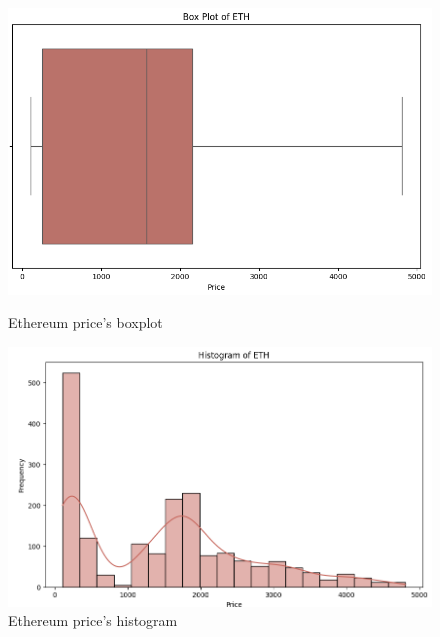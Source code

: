 \documentclass{ieeeojies}
\begin{document}
\begin{figure}[H]
	\centering
	\begin{minipage}{0.23\textwidth}
		\centering
		\includegraphics[width=1\textwidth]{bibliography/Figure/ETH_BoxPlot.PNG}
		\caption{Ethereum price's boxplot}
		\label{fig:1}
	\end{minipage}
	\hfill
	\begin{minipage}{0.23\textwidth}
		\centering
		\includegraphics[width=1\textwidth]{bibliography/Figure/ETH_Histogram.PNG}
		\caption{Ethereum price's histogram}
		\label{fig:2}
	\end{minipage}
\end{figure}
\end{document}
